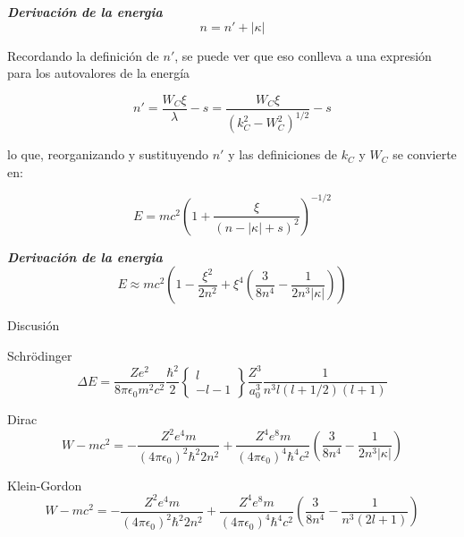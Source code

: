 \documentclass{beamer}
\begin{document}
\begin{frame}{\textit{\textbf{Derivaci\'on de la energia}}}
\begin{equation}
n=n'+|\kappa|
\end{equation}

Recordando la definici\'on de $n'$, se puede ver que eso conlleva a una expresi\'on para los autovalores de la energ\'ia

\begin{equation}
n'= \frac{W_C \xi}{\lambda}-s=\frac{W_C \xi}{(k^2_{C}-W^2_{C})^{1/2}}-s
\end{equation}

lo que, reorganizando y sustituyendo $n'$ y las definiciones 
de $k_C$ y $W_C$  se convierte en:

\begin{equation}\label{eq:enerW}
E = mc^2 \left(1+\dfrac{\xi}{(n-|\kappa|+s)^2} \right)^{-1/2}
\end{equation}
\end{frame}

\begin{frame}{\textit{\textbf{Derivaci\'on de la energia}}}
\begin{equation}\label{eq:enerW4}
E \approx mc^2 \left(  1- \frac{\xi^2}{2n^2} +\xi^4 \left( \frac{3}{8n^4}-\frac{1}{2n^3 |\kappa|} \right)  \right)
\end{equation}
\end{frame}

\begin{frame}{Discusi\'on}

\centering

Schr\"odinger
\begin{equation}
\Delta E = \frac{Ze^2}{8\pi \epsilon_0 m^2c^2}\frac{\hbar^2}{2} \left\{ \substack{ l \\ -l -1}   \right\}\frac{Z^3}{a^3_0}\frac{1}{n^3 l (l+1/2)(l+1)}
\end{equation}


Dirac
 \begin{equation}\label{eq:enerWfinal}
W-mc^2 = -\frac{Z^2e^4m}{(4\pi\epsilon_0)^2\hbar^2 2n^2}+\frac{Z^4e^8m}{(4\pi\epsilon_0)^4\hbar^4 c^2} \left( \frac{ 3}{8n^4}-\frac{1}{2n^3|\kappa|} \right)
\end{equation}

Klein-Gordon
\begin{equation}
W-mc^2 = -\frac{Z^2e^4m}{(4\pi\epsilon_0)^2\hbar^2 2n^2}+\frac{Z^4e^8m}{(4\pi\epsilon_0)^4\hbar^4 c^2} \left( \frac{ 3}{8n^4}-\frac{1}{n^3(2l+1)} \right)
\end{equation}


\end{frame}
\end{document}
